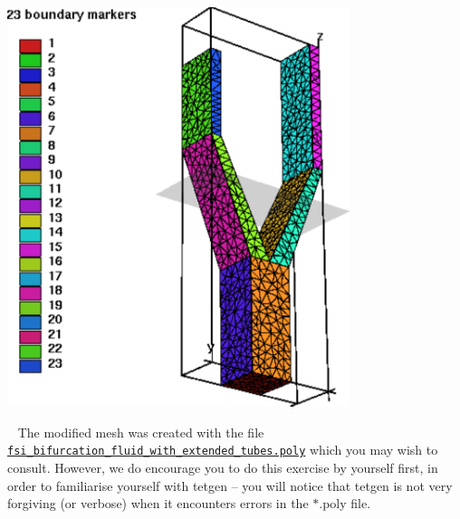\begin{DoxyItemize}
\begin{DoxyImage}
\includegraphics[width=0.75\textwidth]{mesh_boundaries_extended}
\end{DoxyImage}
 ~\newline
 The modified mesh was created with the file {\ttfamily \href{../../../../demo_drivers/navier_stokes/unstructured_three_d_fluid/fsi_bifurcation_fluid_with_extended_tubes.poly}{\tt fsi\+\_\+bifurcation\+\_\+fluid\+\_\+with\+\_\+extended\+\_\+tubes.\+poly} } which you may wish to consult. However, we do encourage you to do this exercise by yourself first, in order to familiarise yourself with {\ttfamily tetgen} -- you will notice that {\ttfamily tetgen} is not very forgiving (or verbose) when it encounters errors in the {\ttfamily $\ast$.poly} file. ~\newline
~\newline


\end{DoxyItemize}
